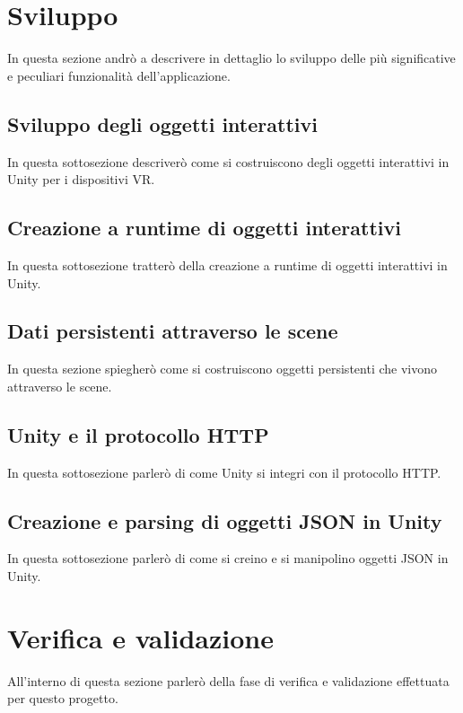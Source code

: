 \section{Sviluppo}

In questa sezione andrò a descrivere in dettaglio lo sviluppo delle più significative e peculiari funzionalità dell'applicazione.

\subsection{Sviluppo degli oggetti interattivi}

In questa sottosezione descriverò come si costruiscono degli oggetti interattivi in Unity per i dispositivi VR.

\subsection{Creazione a runtime di oggetti interattivi}

In questa sottosezione tratterò della creazione a runtime di oggetti interattivi in Unity.

\subsection{Dati persistenti attraverso le scene}

In questa sezione spiegherò come si costruiscono oggetti persistenti che vivono attraverso le scene.

\subsection{Unity e il protocollo HTTP}

In questa sottosezione parlerò di come Unity si integri con il protocollo HTTP.

\subsection{Creazione e parsing di oggetti JSON in Unity}

In questa sottosezione parlerò di come si creino e si manipolino oggetti JSON in Unity.

\section{Verifica e validazione}

All'interno di questa sezione parlerò della fase di verifica e validazione effettuata per questo progetto.
